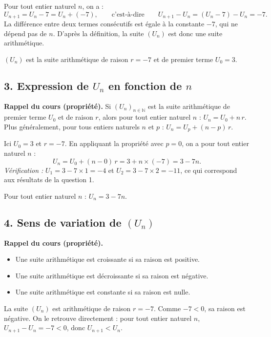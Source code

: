 \documentclass[12pt,a4paper]{article}
\begin{document}
Pour tout entier naturel $n$, on a :
\[
U_{n+1} = U_n - 7 = U_n + (-7),
\qquad \text{c'est-à-dire} \qquad
U_{n+1} - U_n = (U_n - 7) - U_n = -7.
\]
La différence entre deux termes consécutifs est égale à la constante $-7$, qui ne dépend pas de $n$.
D'après la définition, la suite $(U_n)$ est donc une suite arithmétique.

\begin{resultat}
$(U_n)$ est la suite arithmétique de raison $r = -7$ et de premier terme $U_0 = 3$.
\end{resultat}

\subsection*{3. Expression de $U_n$ en fonction de $n$}
\textbf{Rappel du cours (propriété).} Si $(U_n)_{n\in\mathbb{N}}$ est la suite arithmétique de premier
terme $U_0$ et de raison $r$, alors pour tout entier naturel $n$ : $U_n = U_0 + n\,r$.
Plus généralement, pour tous entiers naturels $n$ et $p$ : $U_n = U_p + (n - p)\,r$.

Ici $U_0 = 3$ et $r = -7$. En appliquant la propriété avec $p = 0$, on a pour tout entier naturel $n$ :
\[
U_n = U_0 + (n - 0)\,r = 3 + n \times (-7) = 3 - 7n.
\]
\emph{Vérification :} $U_1 = 3 - 7 \times 1 = -4$ et $U_2 = 3 - 7 \times 2 = -11$, ce qui correspond
aux résultats de la question 1.

\begin{resultat}
Pour tout entier naturel $n$ : \quad $U_n = 3 - 7n$.
\end{resultat}

\subsection*{4. Sens de variation de $(U_n)$}
\textbf{Rappel du cours (propriété).}
\begin{itemize}[nosep]
  \item Une suite arithmétique est croissante si sa raison est positive.
  \item Une suite arithmétique est décroissante si sa raison est négative.
  \item Une suite arithmétique est constante si sa raison est nulle.
\end{itemize}

La suite $(U_n)$ est arithmétique de raison $r = -7$. Comme $-7 < 0$, sa raison est négative.
On le retrouve directement : pour tout entier naturel $n$, $U_{n+1} - U_n = -7 < 0$, donc $U_{n+1} < U_n$.
\end{document}
